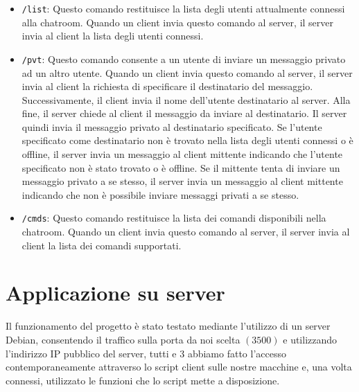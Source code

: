 \documentclass[a4paper,12pt]{report}
\begin{document}
\begin{itemize}
	\item \texttt{/list}: Questo comando restituisce la lista degli utenti attualmente connessi alla chatroom. Quando un client invia questo comando al server, il server invia al client la lista degli utenti connessi.
	\item \texttt{/pvt}: Questo comando consente a un utente di inviare un messaggio privato ad un altro utente. Quando un client invia questo comando al server, il server invia al client la richiesta di specificare il destinatario del messaggio. Successivamente, il client invia il nome dell'utente destinatario al server. Alla fine, il server chiede al client il messaggio da inviare al destinatario. Il server quindi invia il messaggio privato al destinatario specificato. Se l'utente specificato come destinatario non è trovato nella lista degli utenti connessi o è offline, il server invia un messaggio al client mittente indicando che l'utente specificato non è stato trovato o è offline.
	Se il mittente tenta di inviare un messaggio privato a se stesso, il server invia un messaggio al client mittente indicando che non è possibile inviare messaggi privati a se stesso.
	\item \texttt{/cmds}: Questo comando restituisce la lista dei comandi disponibili nella chatroom. Quando un client invia questo comando al server, il server invia al client la lista dei comandi supportati.
\end{itemize}

\chapter{Applicazione su server}
Il funzionamento del progetto è stato testato mediante l'utilizzo di un server Debian, consentendo il traffico sulla porta da noi scelta $(3500)$ e utilizzando l'indirizzo IP pubblico del server, tutti e 3 abbiamo fatto l'accesso contemporaneamente attraverso lo script client sulle nostre macchine e, una volta connessi, utilizzato le funzioni che lo script mette a disposizione.
\end{document}
